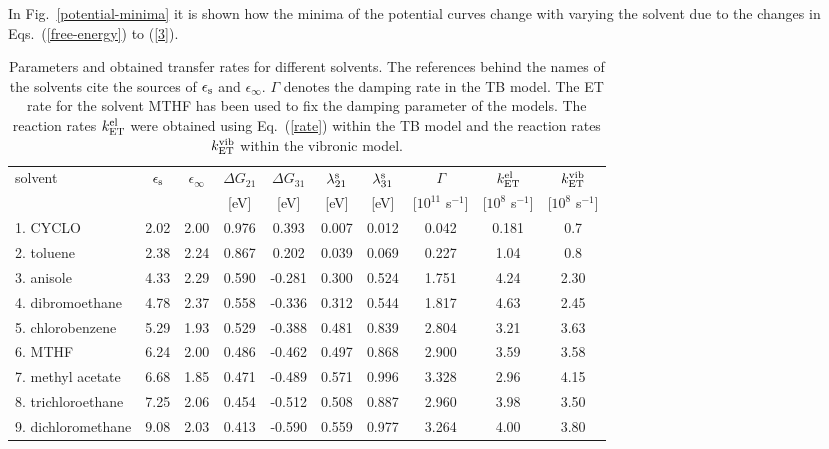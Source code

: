 \documentclass[12pt,twoside,a4paper]{report}
\begin{document}
In Fig.~\ref{potential-minima} it is shown how the minima of the potential curves change
with varying the solvent due to the changes in Eqs.\ (\ref{free-energy}) to
(\ref{3}).
\begin{footnotesize}
\tabcolsep=0.05cm
\begin{table}[!h]
  \begin{center}
 \caption[Parameters and  transfer rates 
 for different solvents]
 {\small Parameters and obtained transfer rates 
 for different solvents. The references behind
the names of the solvents cite the sources of $\epsilon_{\rm s}$
and $\epsilon_\infty$.
$\Gamma$ denotes the damping rate in the TB model.
The ET rate for the solvent MTHF
has been used to fix the damping parameter of the models.
The reaction rates $k_{\rm ET}^{\rm el}$ were obtained using
\protect Eq.~(\ref{rate})
within the TB model and
the reaction rates $k_{\rm ET}^{\rm vib}$  within the vibronic model.
\vspace{3mm}
\newline
}
    \leavevmode
\begin{tabular}{l|c|c|c|c|c|c|c|c|c}
\hline \small
solvent& $\epsilon_{\rm s}$&$\epsilon_\infty$&$\Delta G_{21}$&$\Delta G_{31}$&$\lambda_{21}^{\rm s}$&$\lambda_{31}^{\rm s}$&$\Gamma$ &$k_{\rm ET}^{\rm el}$ &$k_{\rm ET}^{\rm vib}$  \\
& && [{\rm eV}]& [{\rm eV}]&[{\rm eV}]&[{\rm eV}]&[$10^{11}$ s$^{-1}$]& [$10^8$ s$^{-1}$]&[$10^8$ s$^{-1}$] \\
\hline
1. CYCLO \protect \cite{r4}                       &   2.02 & 2.00 & 0.976 &    0.393 &  0.007 & 0.012 & 0.042 &  0.181 & 0.7   \\
2. toluene \protect \cite{tenn99}                 &   2.38 & 2.24 & 0.867 &    0.202 &  0.039 & 0.069 & 0.227 &  1.04  & 0.8   \\
3. anisole  \protect \cite{schm89}                &   4.33 & 2.29 & 0.590 &   -0.281 &  0.300 & 0.524 & 1.751 &  4.24  & 2.30  \\
4. dibromoethane    \protect \cite{schm89}        &   4.78 & 2.37 & 0.558 &   -0.336 &  0.312 & 0.544 & 1.817 &  4.63  & 2.45  \\
5. chlorobenzene     \protect \cite{tenn99}       &   5.29 & 1.93 & 0.529 &   -0.388 &  0.481 & 0.839 & 2.804 &  3.21  & 3.63  \\
6. MTHF    \protect \cite{r4}                 &   6.24 & 2.00 & 0.486 &   -0.462 &  0.497 & 0.868 & 2.900 &  3.59  & 3.58  \\
7. methyl acetate    \protect \cite{tenn99}       &   6.68 & 1.85 & 0.471 &   -0.489 &  0.571 & 0.996 & 3.328 &  2.96  & 4.15  \\
8. trichloroethane      \protect \cite{schm89}    &   7.25 & 2.06 & 0.454 &   -0.512 &  0.508 & 0.887 & 2.960 &  3.98  & 3.50   \\
9. dichloromethane \protect \cite{r4}         &   9.08 & 2.03 & 0.413 &   -0.590 &  0.559 & 0.977 & 3.264 &  4.00  & 3.80  \\
\hline
\end{tabular}
      \label{tab1}
  \end{center}
\end{table} 
\end{footnotesize} \normalsize
\end{document}
